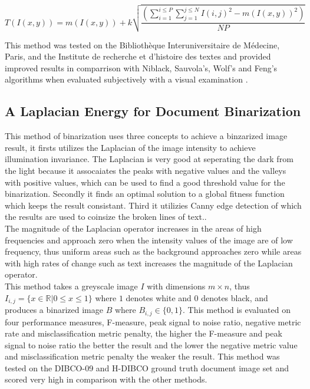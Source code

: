 \documentclass[11pt]{article}
\begin{document}
				\begin{Large}
				\begin{equation} \label{eq:khurshid}
					T(I(x, y)) = m(I(x, y)) + k \sqrt{\frac{(\displaystyle\sum_{i=1}^{i \leq P}\sum_{j=1}^{j \leq N} I(i, j)^2 - m(I(x, y))^2)}{NP}}
				\end{equation}
				\end{Large}

  			This method was tested on  the Bibliothèque Interuniversitaire de Médecine, Paris, and  the Institute de recherche et d’histoire des textes and provided improved results in comparrison with Niblack, Sauvola's, Wolf's and Feng's algorithms when evaluated subjectively with a visual examination \cite{khurshid2009comparison}.

				\newpage

  		\subsection{A Laplacian Energy for Document Binarization}%
  			This method of binarization uses three concepts to achieve a binzarized image result, it firsts utilizes the Laplacian of the image intensity to achieve illumination invariance. The Laplacian is very good at seperating the dark from the light because it assocaiates the peaks with negative values and the valleys with positive values, which can be used to find a good threshold value for the binarization. Secondly it finds an optimal  solution to a global fitness function which keeps the result consistant. Third it utilizies Canny edge detection of which the results are used to coinsize the broken lines of text.\cite{howe2011laplacian}.\\

  			The magnitude of the Laplacian operator increases in the areas of high frequencies and approach zero when the intensity values of the image are of low frequency, thus uniform areas such as the background approaches zero while areas with high rates of change such as text increases the magnitude of the Laplacian operator\cite{howe2011laplacian}.\\

  			This method takes a greyscale image $I$ with dimensions $m\times n$, thus $I_{i,j} = \{x \in \mathbb{R}|0 \leq x \leq 1\}$ where $1$ denotes white and $0$ denotes black, and produces a binarized image $B$ where $B_{i,j} \in\{0,1\}$. This method is evaluated on four performance measures, F-measure, peak signal to noise ratio, negative metric rate and misclassification metric penalty, the higher the F-measure and peak signal to noise ratio the better the result and the lower the negative metric value and misclassification metric penalty the weaker the result. This method was tested on the DIBCO-09 and H-DIBCO ground truth document image set and scored very high in comparison with the other methods\cite{howe2011laplacian}.\\
\end{document}
